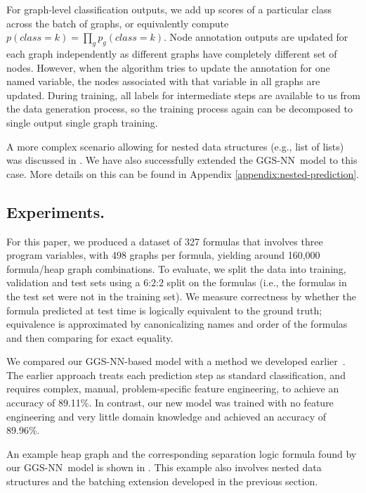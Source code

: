 \documentclass{article} %
\newcommand{\OurMethodMinorShort}{GG-NN}
\newcommand{\OurMethodMinorShorts}{\OurMethodMinorShort s}
\newcommand{\OurMethodShort}{GGS-NN}
\begin{document}
For graph-level classification outputs, we add up scores of a particular class
across the batch of graphs, or equivalently compute $p(class=k)=\prod_g
p_g(class=k)$.
Node annotation outputs are updated for each graph independently as different
graphs have completely different set of nodes.  However, when the algorithm tries to
update the annotation for one named variable, the nodes
associated with that variable in all graphs are updated.
During training, all labels for intermediate steps are available to us from the data
generation process, so the training process again can be decomposed to single
output single graph training.


A more complex scenario allowing for nested data structures (e.g., list of lists) was discussed in
\cite{brockschmidt2015learning}.
We have also successfully extended the \OurMethodShort~model to this case.
More details on this can be found in Appendix
\ref{appendix:nested-prediction}.


\subsection{Experiments. }
\label{sec:program-verification-results}

For this paper, we produced a dataset of 327 formulas that involves three
program variables, with 498 graphs per formula, yielding around 160,000
formula/heap graph combinations.
To evaluate, we split the data into training, validation and test
sets using a 6:2:2 split on the formulas (i.e., the formulas in the test set
were not in the training set). We measure correctness by
whether the formula predicted at test time is logically equivalent to the
ground truth; equivalence is approximated by canonicalizing names and order
of the formulas and then comparing for exact equality.

We compared our \OurMethodShort-based model with a method we developed
earlier~\citep{brockschmidt2015learning}.
The earlier approach treats each prediction step as standard classification,
and requires complex, manual, problem-specific feature
engineering, to achieve
an accuracy of 89.11\%.
In contrast, our new model was trained with no feature engineering and very
little domain knowledge and achieved an accuracy of 89.96\%.

An example heap graph and the corresponding separation logic formula found by
our \OurMethodShort~model is shown in
. This example also involves nested
data structures and the batching extension developed in the previous section.
\end{document}
